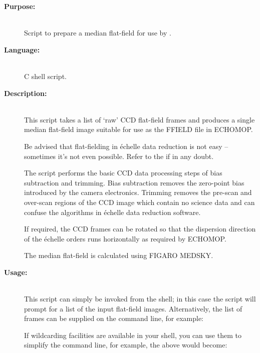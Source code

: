 \documentclass[twoside,11pt]{starlink}
\providecommand{\scspec}[2]{#1}
\begin{document}
\begin{description}

\item [\textbf{Purpose:}] \mbox{} \\
     Script to prepare a median flat-field for use by
     .

\item [\textbf{Language:}] \mbox{} \\
     C shell script.

\item [\textbf{Description:}] \mbox{} \\
     This script takes a list of `raw' CCD flat-field frames and
     produces a single median flat-field image suitable for use as
     the FFIELD file in ECHOMOP.

     Be advised that flat-fielding in \'{e}chelle data reduction is not
     easy \scspec{--}{-} sometimes it's not even possible.  Refer to the
      if in any doubt.

     The script performs the basic CCD data processing steps of bias
     subtraction and trimming.  Bias subtraction removes the zero-point
     bias introduced by the camera electronics.  Trimming removes the
     pre-scan and over-scan regions of the CCD image which contain no
     science data and can confuse the algorithms in \'{e}chelle data
     reduction software.

     If required, the CCD frames can be rotated so that the dispersion
     direction of the \'{e}chelle orders runs horizontally as required by
     ECHOMOP.

     The median flat-field is calculated using FIGARO MEDSKY.

\item [\textbf{Usage:}] \mbox{} \\
     This script can simply be invoked from the shell; in this case
     the script will prompt for a list of the input flat-field images.
     Alternatively, the list of frames can be supplied on the
     command line, for example:

\begin{terminalv}
\end{terminalv}

     If wildcarding facilities are available in your shell, you can use
     them to simplify the command line, for example, the above would
     become:


\end{description}
\end{document}
